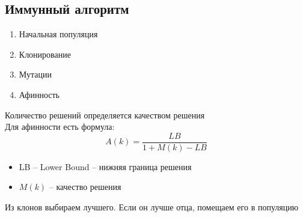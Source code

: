 \subsection{Иммунный алгоритм}

\begin{enumerate}
	\item Начальная популяция
    \item Клонирование
    \item Мутации
    \item Афинность
\end{enumerate}

Количество решений определяется качеством решения \\
Для афинности есть формула:
$$ A(k) = \frac{LB}{1 + M(k) - LB} $$
\begin{itemize}
	\item LB -- Lower Bound -- нижняя граница решения
    \item $ M(k) $ -- качество решения
\end{itemize}

Из клонов выбираем лучшего. Если он лучше отца, помещаем его в популяцию
